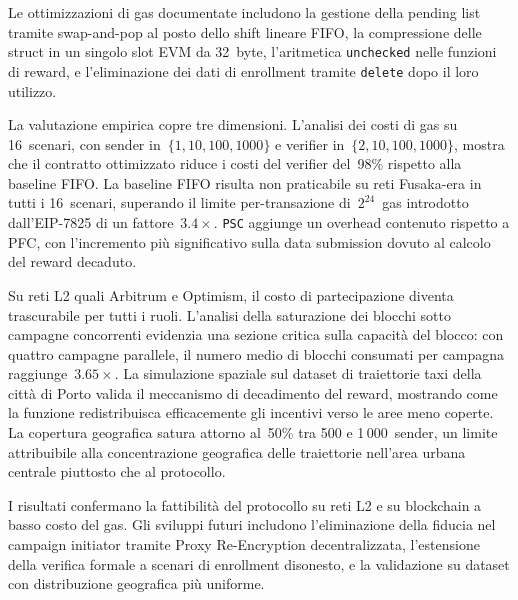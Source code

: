 Le ottimizzazioni di gas documentate includono la gestione della
pending list tramite swap-and-pop al posto dello shift lineare FIFO,
la compressione delle struct in un singolo slot EVM da 32~byte,
l'aritmetica \texttt{unchecked} nelle funzioni di reward, e
l'eliminazione dei dati di enrollment tramite \texttt{delete} dopo
il loro utilizzo.

La valutazione empirica copre tre dimensioni.
L'analisi dei costi di gas su 16~scenari, con sender in~$\{1, 10, 100, 1000\}$ e verifier in~$\{2, 10, 100, 1000\}$,
mostra che il contratto ottimizzato riduce i costi del verifier del~98\% rispetto alla
baseline FIFO.
La baseline FIFO risulta non praticabile su reti Fusaka-era in tutti
i 16~scenari, superando il limite per-transazione di~$2^{24}$~gas
introdotto dall'EIP-7825 di un fattore~$3.4\times$.
\texttt{PSC} aggiunge un overhead contenuto rispetto a PFC, con l'incremento
più significativo sulla data submission dovuto al calcolo del reward decaduto.

Su reti L2 quali Arbitrum e Optimism, il costo di partecipazione
diventa trascurabile per tutti i ruoli.
L'analisi della saturazione dei blocchi sotto campagne concorrenti
evidenzia una sezione critica sulla capacità del blocco: con quattro
campagne parallele, il numero medio di blocchi consumati per
campagna raggiunge~$3.65\times$.
La simulazione spaziale sul dataset di traiettorie taxi della città
di Porto valida il meccanismo di decadimento del reward, mostrando
come la funzione redistribuisca efficacemente gli incentivi verso le
aree meno coperte.
La copertura geografica satura attorno al~50\% tra 500 e
1\,000~sender, un limite attribuibile alla concentrazione geografica
delle traiettorie nell'area urbana centrale piuttosto che al
protocollo.

I risultati confermano la fattibilità del protocollo su reti L2
e su blockchain a basso costo del gas.
Gli sviluppi futuri includono l'eliminazione della fiducia nel
campaign initiator tramite Proxy Re-Encryption decentralizzata,
l'estensione della verifica formale a scenari di enrollment
disonesto, e la validazione su dataset con distribuzione geografica
più uniforme.